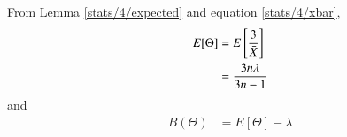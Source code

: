 \begin{enumerate}
        From Lemma \ref{stats/4/expected} and equation \eqref{stats/4/xbar},
        \begin{align}
            E[\Theta] &= E\left[  \dfrac{3}{\Bar{X}}  \right]  \\
            &= \dfrac{3n\lambda}{3n-1}
        \end{align}
and
        \begin{align}
            B(\Theta) & = E[\Theta] - \lambda \\

\end{align}
\end{enumerate}
